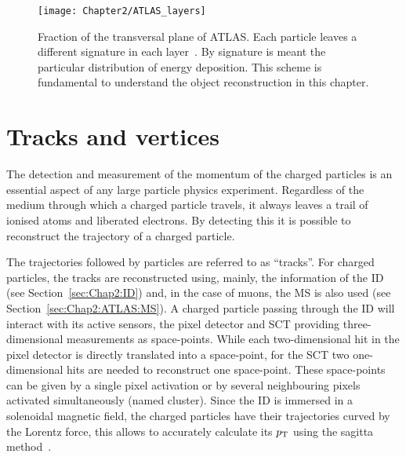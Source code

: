 
\begin{figure}
	\centering
 	 \texttt{[image: Chapter2/ATLAS\_layers]}
	 \caption{Fraction of the transversal plane of ATLAS. Each particle leaves a different signature in each layer~\cite{Pequenao:1505342}. 
	 By signature is meant the particular
	 distribution of energy deposition. This scheme is fundamental to understand the object reconstruction in this chapter. }
	\label{fig:Chap2:ATLAS:ATLAS_Layers}
\end{figure}

\section{Tracks and vertices} %
\label{sec:Chap3:Reco:Tracking}
The detection and measurement of the momentum of the charged particles is an essential aspect of any large particle physics
experiment. Regardless of the medium through which a charged particle travels, it always leaves a trail
of ionised atoms and liberated electrons. By detecting this it is possible to reconstruct the trajectory of a charged
particle. 

The trajectories followed by particles are referred to as ``tracks''. For charged particles, the tracks are reconstructed
using, mainly, the information of the ID (see Section~\ref{sec:Chap2:ID}) and, 
in the case of muons, the MS is also used (see Section~\ref{sec:Chap2:ATLAS:MS}).
 A charged particle passing through the ID will interact with its active sensors, the pixel detector and SCT
 providing three-dimensional measurements as space-points.  
 While each two-dimensional hit in the pixel detector is directly translated into a space-point, for the SCT
 two one-dimensional hits are needed to reconstruct one space-point. %
These space-points can be given by a single pixel activation or 
by several neighbouring pixels activated simultaneously (named cluster). 
Since the ID is immersed in a solenoidal magnetic field, the charged particles have their trajectories curved
by the Lorentz force, this allows to accurately calculate its $p_{\text{T}}$  using the sagitta method~\cite{ATLAS:2020ixw}.


